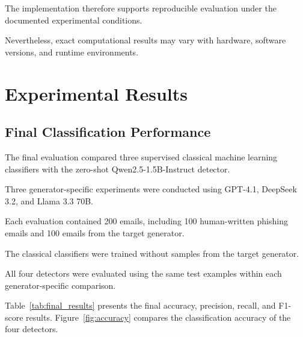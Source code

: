 \documentclass[sigconf,nonacm]{acmart}
\begin{document}
The implementation therefore supports
reproducible evaluation under the
documented experimental conditions.

Nevertheless, exact computational results
may vary with hardware, software versions,
and runtime environments.


\section{Experimental Results}

\subsection{Final Classification Performance}

The final evaluation compared three supervised
classical machine learning classifiers with
the zero-shot Qwen2.5-1.5B-Instruct detector.

Three generator-specific experiments were
conducted using GPT-4.1, DeepSeek 3.2,
and Llama 3.3 70B.

Each evaluation contained 200 emails,
including 100 human-written phishing emails
and 100 emails from the target generator.

The classical classifiers were trained
without samples from the target generator.

All four detectors were evaluated using
the same test examples within each
generator-specific comparison.

Table~\ref{tab:final_results} presents the
final accuracy, precision, recall,
and F1-score results.
Figure~\ref{fig:accuracy} compares the
classification accuracy of the four detectors.
\end{document}
